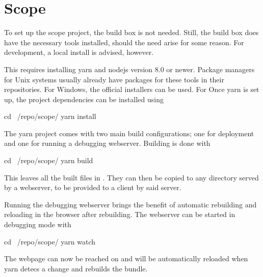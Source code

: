 %
%
\chapter{Scope} %
\label{ch:devguide:scope}


To set up the scope project, the build box is not needed. Still, the build box
does  have the  necessary  tools installed,  should the  need  arise for  some
reason.  For development, a local install is advised, however.

This  requires installing  yarn  and  nodejs version  8.0  or newer.   Package
managers for  Unix systems usually  already have  packages for these  tools in
their repositories. For  Windows, the  official installers  can be  used.  For
Once yarn is set up, the project dependencies can be installed using
\begin{commandshell}
    cd ~/repo/scope/
    yarn install
\end{commandshell}
\noindent The yarn  project comes with two main  build configurations; one for
deployment and one for running a debugging webserver. Building is done with
\begin{commandshell}
    cd ~/repo/scope/
    yarn build
\end{commandshell}

This leaves all the built files in . They can then be
copied to any directory  served by a webserver, to be provided  to a client by
said server.

Running the debugging webserver brings the benefit of automatic rebuilding and
reloading in  the browser  after rebuilding. The webserver  can be  started in
debugging mode with
\begin{commandshell}
    cd ~/repo/scope/
    yarn watch
\end{commandshell}
The webpage  can now  be reached on   and  will be
automatically reloaded when yarn detecs a change and rebuilds the bundle.

